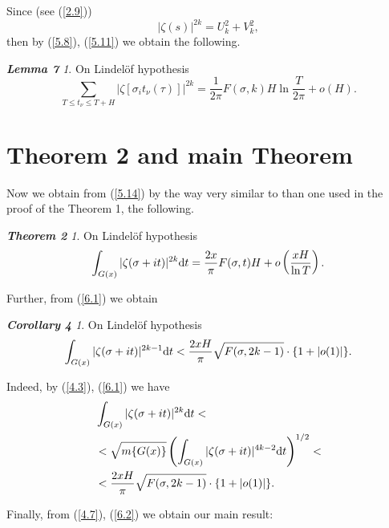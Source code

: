 \documentclass{amsart}
\theoremstyle{definition}
\theoremstyle{remark}
\newtheorem*{mydef12}{{\bf Theorem 2}}
\newtheorem*{mydef44}{{\bf Corollary 4}}
\newtheorem*{mydef57}{{\bf Lemma 7}}
\numberwithin{equation}{section}
\begin{document}
Since (see (\ref{2.9}))
\begin{displaymath}
|\zeta(s)|^{2k}=U_k^2+V_k^2 ,
\end{displaymath}
then by (\ref{5.8}), (\ref{5.11}) we obtain the following.

\begin{mydef57}
On Lindel\" of hypothesis
\begin{equation} \label{5.14}
\sum_{T\leq t_\nu\leq T+H} |\zeta[\sigma_it_\nu(\tau)]|^{2k}=\frac{1}{2\pi}F(\sigma,k)H\ln\frac{T}{2\pi}+o(H).
\end{equation}
\end{mydef57}

\section{Theorem 2 and main Theorem}

Now we obtain from (\ref{5.14}) by the way very similar to than one used in the proof of the Theorem 1, the following.

\begin{mydef12}
On Lindel\" of hypothesis
\begin{equation} \label{6.1}
\int_{G(x)}|\zeta(\sigma+it)|^{2k}{\rm d}t=\frac{2x}{\pi}F(\sigma,t)H+o\left(\frac{xH}{\ln T}\right).
\end{equation}
\end{mydef12}

Further, from (\ref{6.1}) we obtain

\begin{mydef44}
On Lindel\" of hypothesis
\begin{equation} \label{6.2}
\int_{G(x)}|\zeta(\sigma+it)|^{2k-1}{\rm d}t<\frac{2xH}{\pi}\sqrt{F(\sigma,2k-1)}\cdot \{1+|o(1)|\}.
\end{equation}
\end{mydef44}

Indeed, by (\ref{4.3}), (\ref{6.1}) we have
\begin{displaymath}
\begin{split}
& \int_{G(x)}|\zeta(\sigma+it)|^{2k}{\rm d}t< \\
& < \sqrt{m\{ G(x)\}}\left( \int_{G(x)}|\zeta(\sigma+it)|^{4k-2}{\rm d}t\right)^{1/2}< \\
& < \frac{2xH}{\pi}\sqrt{F(\sigma,2k-1)}\cdot\{ 1+|o(1)|\}.
\end{split}
\end{displaymath}

Finally, from (\ref{4.7}), (\ref{6.2}) we obtain our main result:
\end{document}
